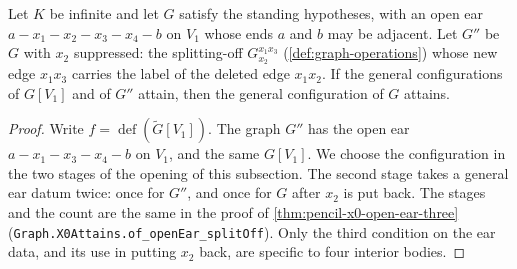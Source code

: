 \begin{theorem}
  \label{thm:pencil-x0-open-ear-four}
  \leanok
  Let $K$ be infinite and let $G$ satisfy the standing hypotheses, with
  an open ear $a - x_1 - x_2 - x_3 - x_4 - b$ on $V_1$ whose ends $a$ and
  $b$ may be adjacent. Let $G''$ be $G$ with $x_2$ suppressed: the
  splitting-off $G_{x_2}^{x_1 x_3}$ (\cref{def:graph-operations}) whose
  new edge $x_1 x_3$ carries the label of the deleted edge $x_1 x_2$. If
  the general configurations of $G[V_1]$ and of $G''$ attain, then the
  general configuration of $G$ attains.
\end{theorem}
\begin{proof}
  \leanok
  Write $f = \operatorname{def}(\tilde G[V_1])$. The graph $G''$ has the
  open ear $a - x_1 - x_3 - x_4 - b$ on $V_1$, and the same $G[V_1]$. We
  choose the configuration in the two stages of the opening of this
  subsection. The second stage takes a general ear datum twice: once for
  $G''$, and once for $G$ after $x_2$ is put back. The stages and the
  count are the same in the proof of \cref{thm:pencil-x0-open-ear-three}
  (\texttt{Graph.X0Attains.of\_openEar\_splitOff}). Only the third
  condition on the ear data, and its use in putting $x_2$ back, are
  specific to four interior bodies.


\end{proof}
